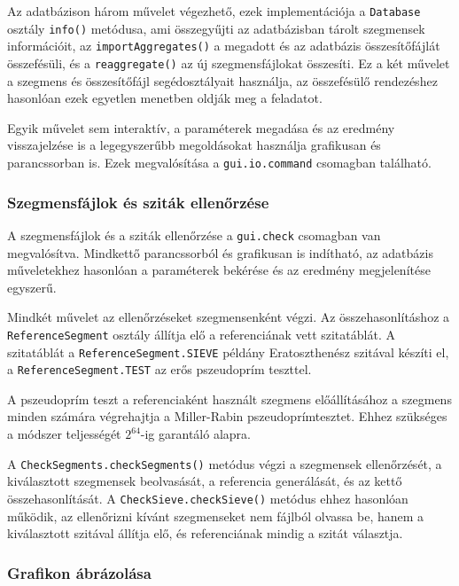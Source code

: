 Az adatbázison három művelet végezhető, ezek implementációja a \texttt{Database} osztály \texttt{info()} metódusa, ami összegyűjti az adatbázisban tárolt szegmensek információit, az \texttt{importAggregates()} a megadott és az adatbázis összesítőfájlát összefésüli, és a \texttt{reaggregate()} az új szegmensfájlokat összesíti.
Ez a két művelet a szegmens és összesítőfájl segédosztályait használja, az összefésülő rendezéshez hasonlóan ezek egyetlen menetben oldják meg a feladatot.

Egyik művelet sem interaktív, a paraméterek megadása és az eredmény visszajelzése is a legegyszerűbb megoldásokat használja grafikusan és parancssorban is.
Ezek megvalósítása a \texttt{gui.io.command} csomagban található.

\subsubsection{Szegmensfájlok és sziták ellenőrzése}

A szegmensfájlok és a sziták ellenőrzése a \texttt{gui.check} csomagban van megvalósítva.
Mindkettő parancssorból és grafikusan is indítható, az adatbázis műveletekhez hasonlóan a paraméterek bekérése és az eredmény megjelenítése egyszerű.

Mindkét művelet az ellenőrzéseket szegmensenként végzi.
Az összehasonlításhoz a \texttt{ReferenceSegment} osztály állítja elő a referenciának vett szitatáblát.
A szitatáblát a \texttt{ReferenceSegment.SIEVE} példány Eratoszthenész szitával készíti el, a \texttt{ReferenceSegment.TEST} az erős pszeudoprím teszttel.

A pszeudoprím teszt a referenciaként használt szegmens előállításához a szegmens minden számára végrehajtja a Miller-Rabin pszeudoprímtesztet.
Ehhez szükséges a módszer teljességét $2^{64}$-ig garantáló alapra\cite{pseudoprimebase}.

A \texttt{CheckSegments.checkSegments()} metódus végzi a szegmensek ellenőrzését, a kiválasztott szegmensek beolvasását, a referencia generálását, és az kettő összehasonlítását.
A \texttt{CheckSieve.checkSieve()} metódus ehhez hasonlóan működik, az ellenőrizni kívánt szegmenseket nem fájlból olvassa be, hanem a kiválasztott szitával állítja elő, és referenciának mindig a szitát választja.

\subsubsection{Grafikon ábrázolása}

